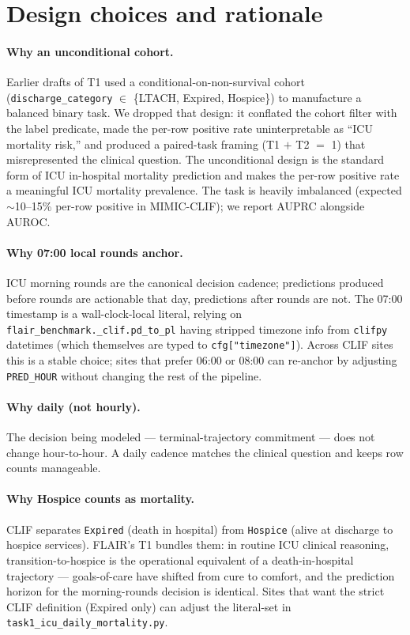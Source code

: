 \documentclass[11pt]{article}
\begin{document}
\section{Design choices and rationale}
\label{sec:rationale}

\paragraph{Why an unconditional cohort.}
Earlier drafts of T1 used a conditional-on-non-survival cohort
(\texttt{discharge\_category} $\in$ \{LTACH, Expired, Hospice\}) to
manufacture a balanced binary task. We dropped that design: it
conflated the cohort filter with the label predicate, made the per-row
positive rate uninterpretable as ``ICU mortality risk,'' and produced
a paired-task framing (T1 $+$ T2 $=$ 1) that misrepresented the
clinical question. The unconditional design is the standard form of
ICU in-hospital mortality prediction \citep{johnson2016mimiciii} and
makes the per-row positive rate a meaningful ICU mortality prevalence.
The task is heavily imbalanced (expected $\sim$10--15\% per-row
positive in MIMIC-CLIF); we report AUPRC alongside AUROC.

\paragraph{Why 07:00 local rounds anchor.}
ICU morning rounds are the canonical decision cadence; predictions
produced before rounds are actionable that day, predictions after
rounds are not. The 07:00 timestamp is a wall-clock-local literal,
relying on \texttt{flair\_benchmark.\_clif.pd\_to\_pl} having stripped
timezone info from \texttt{clifpy} datetimes (which themselves are
typed to \texttt{cfg["timezone"]}). Across CLIF sites this is a stable
choice; sites that prefer 06:00 or 08:00 can re-anchor by adjusting
\texttt{PRED\_HOUR} without changing the rest of the pipeline.

\paragraph{Why daily (not hourly).}
The decision being modeled --- terminal-trajectory commitment --- does
not change hour-to-hour. A daily cadence matches the clinical question
and keeps row counts manageable.

\paragraph{Why Hospice counts as mortality.}
CLIF separates \texttt{Expired} (death in hospital) from
\texttt{Hospice} (alive at discharge to hospice services). FLAIR's T1
bundles them: in routine ICU clinical reasoning, transition-to-hospice
is the operational equivalent of a death-in-hospital trajectory ---
goals-of-care have shifted from cure to comfort, and the prediction
horizon for the morning-rounds decision is identical. Sites that want
the strict CLIF definition (Expired only) can adjust the literal-set
in \texttt{task1\_icu\_daily\_mortality.py}.
\end{document}
